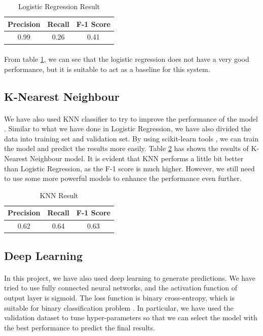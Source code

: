 \documentclass[fleqn,11pt]{olplainarticle}
\begin{document}
\begin{table}[!htbp]
\centering
\caption{Logistic Regression Result}\label{tab:lr}
\begin{tabular}{ccc}
\toprule
Precision& Recall& F-1 Score\\
\midrule
0.99& 0.26& 0.41\\
\bottomrule
\end{tabular}
\end{table}
\paragraph*{}
From table \ref{tab:lr}, we can see that the logistic regression does not have a very good performance, but it is suitable to act as a baseline for this system.

\subsection{K-Nearest Neighbour}\label{knn}
\paragraph*{}
We have also used KNN classifier to try to improve the performance of the model \citep{Rebala2019}. Similar to what we have done in Logistic Regression, we have also divided the data into training set and validation set. By using scikit-learn tools \citep{scikit-learn}, we can train the model and predict the results more easily. Table \ref{tab:knn} has shown the results of K-Nearest Neighbour model. It is evident that KNN performs a little bit better than Logistic Regression, as the F-1 score is much higher. However, we still need to use some more powerful models to enhance the performance even further.

\begin{table}[!htbp]
\centering
\caption{KNN Result}\label{tab:knn}
\begin{tabular}{ccc}
\toprule
Precision& Recall& F-1 Score\\
\midrule
0.62& 0.64& 0.63\\
\bottomrule
\end{tabular}
\end{table}



\subsection{Deep Learning}\label{dnn}
\paragraph*{}
In this project, we have also used deep learning to generate predictions. We have tried to use fully connected neural networks, and the activation function of output layer is sigmoid. The loss function is binary cross-entropy, which is suitable for binary classification problem \citep{tensorflow2015-whitepaper}. In particular, we have used the validation dataset to tune hyper-parameters so that we can select the model with the best performance to predict the final results.
\end{document}
